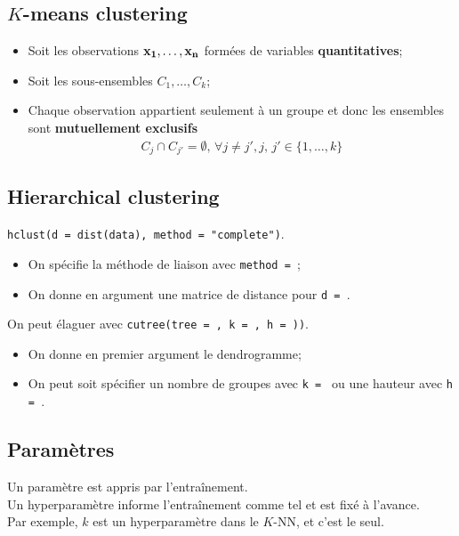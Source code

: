 \documentclass[10pt, french]{article}
\begin{document}
\begin{multicols*}{3}
\subsection*{$K$-means clustering}
\begin{distributions}[Notation]
\begin{itemize}[leftmargin = *]
	\item	Soit les observations $\mathbf{x_{1}, \dots, x_{n}}$ formées de variables \textbf{quantitatives};
	\item	Soit les sous-ensembles $C_{1}, \dots, C_{k}$;
	\item	Chaque observation appartient seulement à un groupe et donc les ensembles sont \textbf{mutuellement exclusifs}
		\begin{align*}
		C_{j} \cap C_{j'} = \emptyset, \, \forall j \neq j', j, \, j' \in \{1, \dots, k\}
		\end{align*}
\end{itemize}
\end{distributions}

\subsection*{Hierarchical clustering}

\begin{definitionNOHFILLsub}
\texttt{hclust(d = dist(data), method = "complete")}.
\begin{itemize}
	\item	On spécifie la méthode de liaison avec \texttt{method = };
	\item	On donne en argument une matrice de distance pour \texttt{d = }.
\end{itemize}

On peut élaguer avec \texttt{cutree(tree = , k = , h = ))}.
\begin{itemize}
	\item	On donne en premier argument le dendrogramme;
	\item	On peut soit spécifier un nombre de groupes avec \texttt{k = } ou une hauteur avec \texttt{h = }.
\end{itemize}
\end{definitionNOHFILLsub}

\subsection*{Paramètres}
Un paramètre est appris par l'entraînement.\\
Un hyperparamètre informe l'entraînement comme tel et est fixé à l'avance. \\
Par exemple, $k$ est un hyperparamètre dans le $K$-NN, et c'est le seul.


\end{multicols*}
\end{document}
